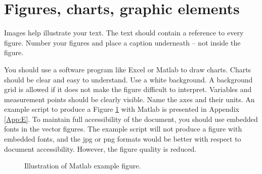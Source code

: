 \begin{table}[!h]
    \centering
    \caption{Sensor measurements.}
    \label{tab:1}
\end{table}

\section*{Figures, charts, graphic elements}
Images help illustrate your text. The text should contain a reference to every figure. Number your figures and place a caption underneath – not inside the figure.

You should use a software program like Excel or Matlab to draw charts. Charts should be clear and easy to understand. Use a white background. A background grid is allowed if it does not make the figure difficult to interpret. Variables and measurement points should be clearly visible. Name the axes and their units. An example script to produce a Figure \ref{fig:1} with Matlab is presented in Appendix \ref{App:E}. To maintain full accessibility of the document, you should use embedded fonts in the vector figures. The example script will not produce a figure with embedded fonts, and the jpg or png formats would be better with respect to document accessibility. However, the figure quality is reduced.

\begin{figure}[!h]
   \centering
    \caption{Illustration of Matlab example figure.}
    \label{fig:1}
\end{figure}

